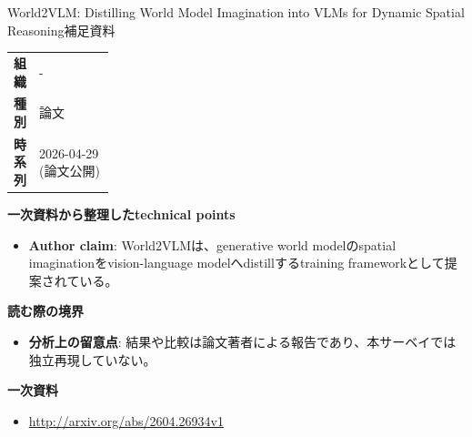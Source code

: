 \begin{technicalnote}{World2VLM: Distilling World Model Imagination into VLMs for Dynamic Spatial Reasoning}{補足資料}
\begingroup
\begin{tabularx}{\linewidth}{@{}>{\bfseries}p{0.22\linewidth}X@{}}
組織 & - \\
種別 & 論文 \\
時系列 & 2026-04-29 (論文公開) \\
\end{tabularx}
\smallskip
{\bfseries 一次資料から整理したtechnical points}
\begin{itemize}[leftmargin=1.5em,itemsep=0.35em]
\item \textbf{Author claim}: World2VLMは、generative world modelのspatial imaginationをvision-language modelへdistillするtraining frameworkとして提案されている。
\end{itemize}
{\bfseries 読む際の境界}
\begin{itemize}[leftmargin=1.5em,itemsep=0.35em]
\item \textbf{分析上の留意点}: 結果や比較は論文著者による報告であり、本サーベイでは独立再現していない。
\end{itemize}
\begin{samepage}
{\bfseries 一次資料}
\begingroup\sloppy
\begin{itemize}[leftmargin=1.5em,itemsep=0.25em]
\item {\scriptsize\url{http://arxiv.org/abs/2604.26934v1}}
\end{itemize}
\endgroup
\end{samepage}
\endgroup
\end{technicalnote}
\medskip
